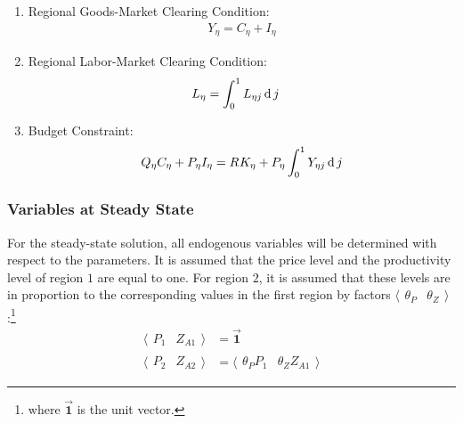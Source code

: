 \documentclass[../thesis.tex]{subfiles}
\begin{document}
\begin{enumerate}
	\item Regional Goods-Market Clearing Condition:
	\begin{align}
		Y_{\eta} = C_{\eta} + I_{\eta} 
		\label{ext-mod:reg-ss-regional-demand}
	\end{align}

	\item Regional Labor-Market Clearing Condition:
	\begin{align}
		L_{\eta} &= \int_{0}^{1} L_{\eta j} \operatorname{d} j \label{ext-mod:reg-ss-market-clearing-condition-Lt}
	\end{align}
	
	\item Budget Constraint:
	\begin{align}
		Q_{\eta} C_{\eta} + P_{\eta} I_{\eta} = R_{} K_{\eta} + P_{\eta} \int_{0}^{1} Y_{\eta j} \operatorname{d} j \label{ext-mod:reg-ss-budget-constraint-3}
	\end{align}

\end{enumerate}

\newpage


\subsubsection{Variables at Steady State}\label{sec:ext-mod-var-ss}

	For the steady-state solution, all endogenous variables will be determined with respect to the parameters. It is assumed that the price level and the productivity level of region $1$ are equal to one. For region $2$, it is assumed that these levels are in proportion to the corresponding values in the first region by factors $\langle \begin{matrix} \theta_{P} & \theta_{Z} \end{matrix} \rangle$:\footnote{where $\vec{\bm{1}}$ is the unit vector.}
	\begin{align}
		\langle \begin{matrix} P_{1} & Z_{A1} \end{matrix} \rangle &= \vec{\bm{1}} \label{ext-mod:reg-ss-p1-za1} 
		\\ 
		\langle \begin{matrix} P_{2} & Z_{A2} \end{matrix} \rangle &= \langle \begin{matrix} \theta_{P} P_{1} & \theta_{Z} Z_{A1} \end{matrix} \rangle \label{ext-mod:reg-ss-p2-za2}
	\end{align}
	
\end{document}
